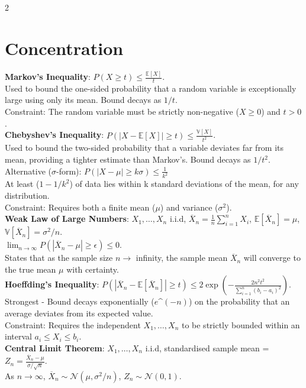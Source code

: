 \documentclass[10pt]{article}
\begin{document}
\begin{multicols*}{2}
\section*{Concentration}
\textbf{Markov's Inequality}: $P(X \ge t) \le \frac{\mathbb{E}[X]}{t}$.\\
Used to bound the one-sided probability that a random variable is exceptionally large using only its mean. Bound decays as $1/t$.\\
Constraint: The random variable must be strictly non-negative ($X \ge 0$) and $t > 0$.\\
\textbf{Chebyshev's Inequality}: $P(|X - \mathbb{E}[X]| \ge t) \le \frac{\mathbb{V}[X]}{t^2}$.\\
Used to bound the two-sided probability that a variable deviates far from its mean, providing a tighter estimate than Markov's. Bound decays as $1/t^2$.\\
Alternative ($\sigma$-form): $P(|X - \mu| \ge k\sigma) \le \frac{1}{k^2}$\\
At least ($1 - 1/k^2$) of data lies within k standard deviations of the mean, for any distribution.\\
Constraint: Requires both a finite mean ($\mu$) and variance ($\sigma^2$).\\
\textbf{Weak Law of Large Numbers}: $X_1,\ldots,X_n$ i.i.d, $\overline{X}_n = \frac{1}{n}\sum_{i=1}^nX_i$, $\mathbb{E}[\overline{X}_n]=\mu$, $\mathbb{V}[\overline{X}_n]=\sigma^2/n$.\\
$\lim_{n\rightarrow\infty}P(|\overline{X}_n - \mu| \ge \epsilon) \le 0$.\\
States that as the sample size $n \to$ infinity, the sample mean $\overline{X}_n$ will converge to the true mean $\mu$ with certainty.\\
\textbf{Hoeffding's Inequality}: $P(|\overline{X}_n - \mathbb{E}[\overline{X}_n]| \ge t) \le 2 \exp\left(-\frac{2n^2t^2}{\sum_{i=1}^n(b_i - a_i)^2}\right)$.\\
Strongest - Bound decays exponentially ($e$\textasciicircum$(-n)$) on the probability that an average deviates from its expected value.\\
Constraint: Requires the independent $X_1,\ldots,X_n$ to be strictly bounded within an interval $a_i \le X_i \le b_i$.\\
\textbf{Central Limit Theorem}: $X_1,\ldots,X_n$ i.i.d, standardised sample mean = $Z_n = \frac{\overline{X}_n - \mu}{\sigma/\sqrt{n}}$.\\
As $n\to\infty$, $\overline{X}_n\sim\mathcal{N}(\mu,\sigma^2/n)$, $Z_n\sim\mathcal{N}(0,1)$.\\

\end{multicols*}
\end{document}
